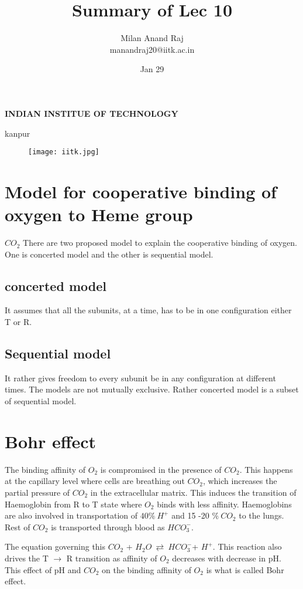 \documentclass[12pt]{article}
\title{Summary of Lec 10}
\author{Milan Anand Raj\\manandraj20@iitk.ac.in}
\date{Jan 29}
\begin{document}
\NoBgThispage
\maketitle



\begin{center}
\textbf{INDIAN INSTITUE OF TECHNOLOGY}

kanpur
\end{center}


\vfill
\begin{figure}
\centering
\texttt{[image: iitk.jpg]}
\end{figure}
\clearpage
\tableofcontents
\clearpage
\NoBgThispage
\section{Model for cooperative binding of oxygen to Heme group}
$CO_{2}$
There are two proposed model to explain the cooperative binding of oxygen. One is concerted model and the other is sequential model.
\subsection{concerted model}
It assumes that all the subunits, at a time, has to be in one configuration either T or R.
\subsection{Sequential model}
It rather gives freedom to every subunit be in any configuration at different times. The models are not mutually exclusive. Rather concerted model is a subset of sequential model.


\section{Bohr effect}
The binding affinity of $O_{2}$ is compromised in the presence of $CO_{2}$. This happens at the capillary level where cells are breathing out $CO_{2}$, which increases the partial pressure of $CO_{2}$ in the extracellular matrix. This induces the transition of Haemoglobin from R to T state where $O_{2}$ binds with less affinity. Haemoglobins are also involved in transportation of $40 \%~H^{+}$ and 15 -20 $\% ~ CO_{2}$ to the lungs. Rest of $CO_{2}$ is transported through blood as $HCO_{3}^{-}$.
 
 The equation governing this $CO_{2}$ + $H_{2}O~ \rightleftarrows ~ HCO_{3}^{-}$+ $H^{+}$.
This reaction also drives the T $\rightarrow$ R transition as affinity of $O_{2}$ decreases with decrease in pH.
 This effect of pH and $CO_{2}$ on the binding affinity of $O_{2}$ is what is called Bohr effect.
 \clearpage
\end{document}
